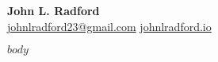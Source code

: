 \documentclass[11pt]{article}
\newcommand{\header}[2]{
  \begin{center}
    {\Huge\bfseries #1}\\[0.5em]
    #2
  \end{center}
  \vspace{.75em}
}
\begin{document}
\header{John L. Radford}{
  \href{mailto:johnlradford23@gmail.com}{johnlradford23@gmail.com}
  \href{https://johnlradford.io}{johnlradford.io}
}

$body$
\end{document}

